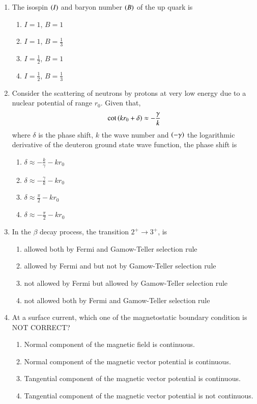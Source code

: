 \documentclass[journal,12pt,onecolumn]{IEEEtran}
\theoremstyle{remark}
\begin{document}
\begin{enumerate}
\item The isospin $\left(I\right)$ and baryon number $\left(B\right)$ of the up quark is
\begin{enumerate}
\item $I=1$, $B=1$
\item $I=1$, $B=\frac{1}{3}$
\item $I=\frac{1}{2}$, $B=1$
\item $I=\frac{1}{2}$, $B=\frac{1}{3}$
\end{enumerate}

\item Consider the scattering of neutrons by protons at very low energy due to a nuclear potential of range $r_0$. Given that,
\begin{align*}
	\cot\left(kr_0 + \delta\right) \approx -\frac{\gamma}{k}
\end{align*}
where $\delta$ is the phase shift, $k$ the wave number and $\left(-\gamma\right)$ the logarithmic derivative of the deuteron ground state wave function, the phase shift is
\begin{enumerate}
\item $\delta \approx -\frac{k}{\gamma} - kr_0$
\item $\delta \approx -\frac{\gamma}{k} - kr_0$
\item $\delta \approx \frac{\pi}{2} - kr_0$
\item $\delta \approx -\frac{\pi}{2} - kr_0$
\end{enumerate}

\item In the $\beta$ decay process, the transition $2^+ \to 3^+$, is
\begin{enumerate}
\item allowed both by Fermi and Gamow-Teller selection rule
\item allowed by Fermi and but not by Gamow-Teller selection rule
\item not allowed by Fermi but allowed by Gamow-Teller selection rule
\item not allowed both by Fermi and Gamow-Teller selection rule
\end{enumerate}

\item At a surface current, which one of the magnetostatic boundary condition is NOT CORRECT?
\begin{enumerate}
\item Normal component of the magnetic field is continuous.
\item Normal component of the magnetic vector potential is continuous.
\item Tangential component of the magnetic vector potential is continuous.
\item Tangential component of the magnetic vector potential is not continuous.
\end{enumerate}


\end{enumerate}
\end{document}
